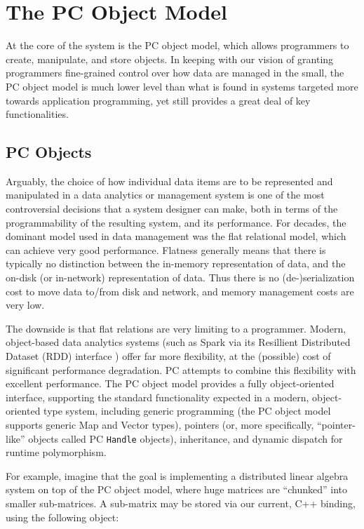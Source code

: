 \section{The PC Object Model} \label{sec:ObjectModel}

At the core of the system is the PC object model, which allows 
programmers to create, manipulate, and store objects.
In keeping with our vision of granting programmers fine-grained control over how data are managed in the small, the PC object model
is much lower level than what is found in systems targeted more towards application programming, yet still provides a great deal of
key functionalities.

\subsection{PC Objects}

Arguably, the choice of how individual data items are to be represented and manipulated
in a data analytics or management system is one of the most
controversial decisions
that a system designer can make, both in terms of 
the programmability of the resulting system, and its performance.  For decades, the dominant model used in
data management was the flat relational model, which 
can achieve very good performance.
Flatness generally means 
that there is typically no distinction between the in-memory representation of data, and the on-disk (or in-network) representation of
data. Thus there is no (de-)serialization cost to move data to/from
disk and network, and memory management costs are very low. 

The downside is that flat relations are very limiting to a programmer.  Modern, object-based 
data analytics systems 
(such as Spark via its Resillient Distributed Dataset (RDD) interface \cite{zaharia2012resilient}) offer far more flexibility, at the (possible) cost of significant performance degradation.  
PC attempts to combine this flexibility with excellent performance.
The PC object model provides a fully object-oriented interface, supporting the standard functionality expected in a modern, object-oriented type system,
including generic programming (the PC object model supports generic Map and Vector types), pointers (or, more specifically,
``pointer-like'' objects called PC \texttt{Handle} objects), inheritance, and dynamic dispatch for runtime polymorphism.  

For example, imagine that the goal is implementing a distributed linear algebra system on top of the PC object model, where huge matrices are ``chunked'' into
smaller sub-matrices.  A sub-matrix may be stored via our current, C++ binding, using the following object:

